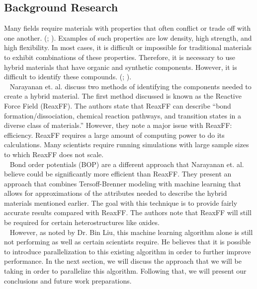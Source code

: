 \documentclass[letterpaper, 12pt]{article}
\begin{document}
\begin{flushleft}

\section*{Background Research}
Many fields require materials with properties that often conflict or trade off with one another. (\cite{Narayanan}; \cite{Ritchie}).  Examples of such properties are low density, high strength, and high flexibility.  In most cases, it is difficult or impossible for traditional materials to exhibit combinations of these properties. Therefore, it is necessary to use hybrid materials that have organic and synthetic components. However, it is difficult to identify these compounds. (\cite{Narayanan}; \cite{Wight}).\\
~\newline
Narayanan et. al. discuss two methods of identifying the components needed to create a hybrid material. The first
method discussed is known as the Reactive Force Field (ReaxFF). The authors state that ReaxFF can describe ``bond formation/dissociation, chemical reaction pathways, and transition states in a diverse class of materials.'' However, they note a major issue with ReaxFF: efficiency. ReaxFF requires a large amount of computing power to do its calculations. Many scientists require running simulations with large sample sizes to which ReaxFF does not scale. \\
~\newline
Bond order potentials (BOP) are a different approach that Narayanan et. al. believe could be significantly more
efficient than ReaxFF. They present an approach that combines Tersoff-Brenner modeling with machine learning that
allows for approximations of the attributes needed to describe the hybrid materials mentioned earlier. The goal
with this technique is to provide fairly accurate results compared with ReaxFF. The authors note that
ReaxFF will still be required for certain heterostructures like oxides. \\
~\newline
However, as noted by Dr. Bin Liu, this machine learning algorithm alone is still not performing as well as 
certain scientists require. He believes that it is possible to introduce parallelization to this existing
algorithm in order to further improve performance. In the next section, we will discuss the approach that we
will be taking in order to parallelize this algorithm.  Following that, we will present our conclusions and future work preparations.


\end{flushleft}
\end{document}
